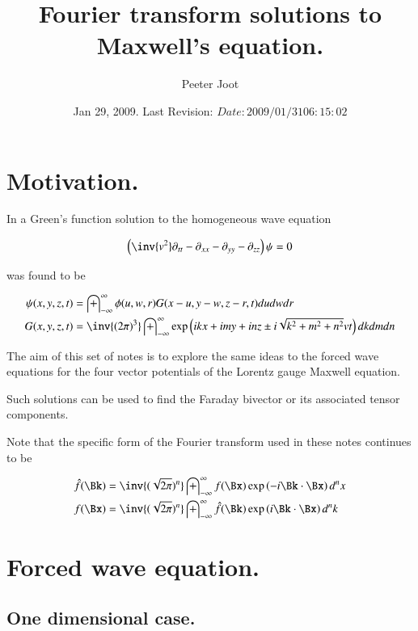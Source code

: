 \documentclass{article}
\title{ Fourier transform solutions to Maxwell's equation. }
\author{Peeter Joot}
\date{ Jan 29, 2009.  Last Revision: $Date: 2009/01/31 06:15:02 $ }
\newcommand{\IIinf}[0]{ \int_{-\infty}^\infty }
\begin{document}
\maketitle{}

\tableofcontents
\section{ Motivation. }

In \cite{PJwaveFourier} a Green's function solution to the homogeneous
wave equation

\begin{align}\label{eqn:wave}
\left(\inv{v^2} \partial_{tt} -\partial_{xx} -\partial_{yy} -\partial_{zz} \right)\psi = 0
\end{align}

was found to be

\begin{align}\label{eqn:greensSolution3d}
{\psi}(x,y,z,t) &= \IIinf \phi(u,w,r) G( x-u, y-w, z-r, t) du dw dr \\
G(x,y,z,t) &= \inv{({2\pi})^3} \IIinf \exp\left( i k x + i m y + i n z \pm i \sqrt{k^2 + m^2 + n^2} v t \right) dk dm dn
\end{align}

The aim of this set of notes is to explore the same ideas to the forced wave
equations for the four vector potentials of the Lorentz gauge Maxwell equation.

Such solutions can be used to find the Faraday bivector or its associated
tensor components.

Note that the specific form of the Fourier transform used in these notes continues to be

\begin{align}
\hat{f}(\Bk) &= \inv{(\sqrt{2\pi})^n} \IIinf f(\Bx) \exp\left( -i \Bk \cdot \Bx \right) d^n x \\
{f}(\Bx) &= \inv{(\sqrt{2\pi})^n} \IIinf \hat{f}(\Bk) \exp\left( i \Bk \cdot \Bx \right) d^n k
\end{align}

\section{ Forced wave equation. }

\subsection{ One dimensional case. }
\end{document}
